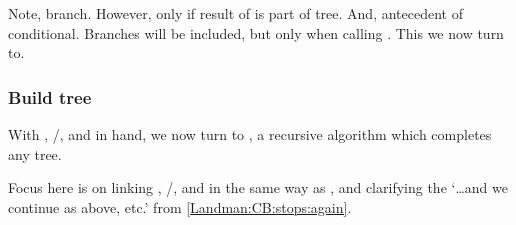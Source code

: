\begin{note}
  Note, branch.
  However, only if result of \AlgGetPStops{} is part of tree.
  And, antecedent of conditional.
  Branches will be included, but only when calling \AlgFindBranches{}.
  This we now turn to.
\end{note}


\subsubsection{Build tree}
\label{cha:fcs:sec:Prog:L:Alg:tree}

\begin{note}
  With \AlgAC{}, \AlgGetStops{}/\AlgGetPStops{}, and \AlgFindBranches{} in hand, we now turn to \AlgDevelopTree{}, a recursive algorithm which completes any tree.

  Focus here is on linking \AlgAC{}, \AlgGetStops{}/\AlgGetPStops{}, and \AlgFindBranches{} in the same way as \citeauthor{Landman:1992wh}, and clarifying the `\dots and we continue as above, etc.' from \ref{Landman:CB:stops:again}.


\end{note}
